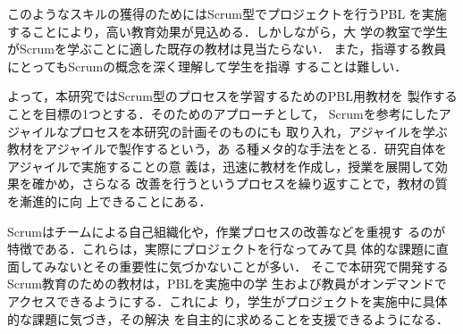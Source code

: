 \documentclass[a4j,twoside]{jarticle}
\begin{document}
\begin{multicols}{2}
	このようなスキルの獲得のためにはScrum型でプロジェクトを行うPBL
	を実施することにより，高い教育効果が見込める．しかしながら，大
	学の教室で学生がScrumを学ぶことに適した既存の教材は見当たらない．
	また，指導する教員にとってもScrumの概念を深く理解して学生を指導
	することは難しい．

	よって，本研究ではScrum型のプロセスを学習するためのPBL用教材を
	製作することを目標の1つとする．そのためのアプローチとして，
	Scrumを参考にしたアジャイルなプロセスを本研究の計画そのものにも
	取り入れ，アジャイルを学ぶ教材をアジャイルで製作するという，あ
	る種メタ的な手法をとる．研究自体をアジャイルで実施することの意
	義は，迅速に教材を作成し，授業を展開して効果を確かめ，さらなる
	改善を行うというプロセスを繰り返すことで，教材の質を漸進的に向
	上できることにある．
	
	Scrumはチームによる自己組織化や，作業プロセスの改善などを重視す
	るのが特徴である．これらは，実際にプロジェクトを行なってみて具
	体的な課題に直面してみないとその重要性に気づかないことが多い．
	そこで本研究で開発するScrum教育のための教材は，PBLを実施中の学
	生および教員がオンデマンドでアクセスできるようにする．これによ
	り，学生がプロジェクトを実施中に具体的な課題に気づき，その解決
	を自主的に求めることを支援できるようになる．
	

\end{multicols}
\end{document}
